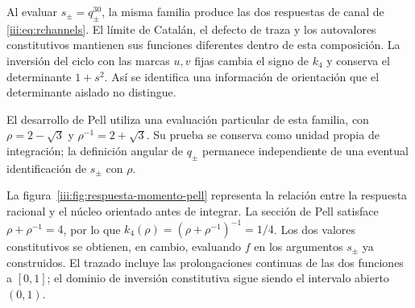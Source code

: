 Al evaluar $s_\pm=q_\pm^{30}$, la misma familia produce las dos respuestas
de canal de \eqref{iii:eq:rchannels}. El límite de Catalán, el defecto de
traza y los autovalores constitutivos mantienen sus funciones diferentes
dentro de esta composición. La inversión del ciclo con las marcas $u,v$
fijas cambia el signo de $k_4$ y conserva el determinante $1+s^2$.
Así se identifica una información de orientación que el determinante
aislado no distingue.

El desarrollo de Pell utiliza una evaluación particular de esta familia,
con $\rho=2-\sqrt3$ y $\rho^{-1}=2+\sqrt3$. Su prueba se conserva como
unidad propia de integración; la definición angular de $q_\pm$ permanece
independiente de una eventual identificación de $s_\pm$ con $\rho$.

La figura~\ref{iii:fig:respuesta-momento-pell} representa la relación entre
la respuesta racional y el núcleo orientado antes de integrar. La sección
de Pell satisface $\rho+\rho^{-1}=4$, por lo que
$k_4(\rho)=(\rho+\rho^{-1})^{-1}=1/4$. Los dos valores constitutivos
se obtienen, en cambio, evaluando $f$ en los argumentos $s_\pm$ ya
construidos. El trazado incluye las prolongaciones continuas de las dos
funciones a $[0,1]$; el dominio de inversión constitutiva sigue siendo
el intervalo abierto $(0,1)$.

